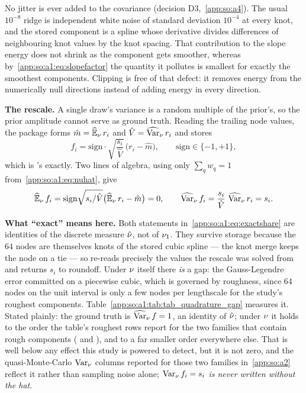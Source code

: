No jitter is ever added to the covariance (decision D3,~\ref{app:so:a4}). The
usual $10^{-8}$ ridge is independent white noise of standard deviation
$10^{-4}$ at every knot, and the stored component is a spline whose derivative
divides differences of neighbouring knot values by the knot spacing. That
contribution to the slope energy does not shrink as the component gets
smoother, whereas by~\eqref{app:so:a1:eq:slopefactor} the quantity it pollutes
is smallest for exactly the smoothest components. Clipping is free of that
defect: it removes energy from the numerically null directions instead of
adding energy in every direction.

\textbf{The rescale.} A single draw's variance is a random multiple of the
prior's, so the prior amplitude cannot serve as ground truth. Reading the
trailing node values, the package forms $\hat m=\operatorname{\widehat{\mathbb{E}}}_\nu r_i$ and $\hat V=\operatorname{\widehat{\mathrm{Var}}}_\nu
r_i$ and stores
\begin{equation}\label{app:so:a1:eq:rescale}
  f_i=\mathrm{sign}\cdot\sqrt{\frac{s_i}{\hat V}}\,\bigl(r_i-\hat m\bigr),
  \qquad \mathrm{sign}\in\{-1,+1\},
\end{equation}
which is 's  exactly. Two lines of
algebra, using only $\sum_q w_q=1$ from~\eqref{app:so:a1:eq:nuhat}, give
\begin{equation}\label{app:so:a1:eq:exactshare}
  \operatorname{\widehat{\mathbb{E}}}_\nu f_i
  =\mathrm{sign}\sqrt{s_i/\hat V}\bigl(\operatorname{\widehat{\mathbb{E}}}_\nu r_i-\hat m\bigr)=0,
  \qquad
  \operatorname{\widehat{\mathrm{Var}}}_\nu f_i=\frac{s_i}{\hat V}\,\operatorname{\widehat{\mathrm{Var}}}_\nu r_i=s_i .
\end{equation}

\textbf{What ``exact'' means here.} Both statements
in~\eqref{app:so:a1:eq:exactshare} are identities of the discrete measure
$\hat\nu$, not of $\nu_1$. They survive storage because the $64$ nodes are
themselves knots of the stored cubic spline --- the knot merge keeps the node
on a tie --- so  re-reads precisely the values the
rescale was solved from and returns $s_i$ to roundoff. Under $\nu$ itself
there \emph{is} a gap: the Gauss-Legendre error committed on a piecewise
cubic, which is governed by roughness, since $64$ nodes on the unit interval
is only a few nodes per lengthscale for the study's roughest components.
Table~\ref{app:so:a1:tab:tab_quadrature_gap} measures it. Stated plainly: the
ground truth is $\operatorname{\widehat{\mathrm{Var}}}_\nu f=1$, an identity of $\hat\nu$; under $\nu$ it holds
to the order the table's roughest rows report for the two families that
contain rough components ( and ), and
to a far smaller order everywhere else. That is well below any effect this
study is powered to detect, but it is not zero, and the quasi-Monte-Carlo
$\operatorname{\mathrm{Var}}_\nu$ columns reported for those two families in~\ref{app:so:a2} reflect it
rather than sampling noise alone; \emph{$\operatorname{\mathrm{Var}}_\nu f_i=s_i$ is never written
without the hat}.

